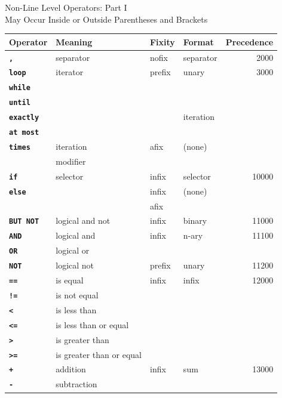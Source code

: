 \documentclass[12pt]{article}
\newcommand{\ttkey}[1]{{\tt \bfseries #1}}
\newlength{\figurewidth}
\newenvironment{boxedfigure}[1][!btp]%
	{\begin{figure*}[#1]
	 \begin{lrbox}{\figurebox}
	 \begin{minipage}{\figurewidth}

	 \vspace*{1ex}}%
	{
	 \vspace*{1ex}

	 \end{minipage}
	 \end{lrbox}

	 \centering
	 \fbox{\hspace*{0.1in}\usebox{\figurebox}\hspace*{0.1in}}
	 \end{figure*}}
\begin{document}
\begin{boxedfigure}[!p]
\begin{center}
Non-Line Level Operators: Part I \\
May Occur Inside or Outside Parentheses and Brackets
\\[1ex]
\begin{tabular}{|l|l|l|l|r|}
\hline
Operator & Meaning & Fixity & Format & Precedence \\
\hline
\ttkey{,} & separator & nofix & separator & 2000
\\\hline
\ttkey{loop} & iterator & prefix & unary & 3000
\\\cline{1-1}
\ttkey{while} &       &        &       &
\\\cline{1-1}
\ttkey{until} &       &        &       &
\\\cline{1-1}\cline{4-4}
\ttkey{exactly} &       &        & iteration       &
\\\cline{1-1}
\ttkey{at most} &       &        &       &
\\\cline{1-4}
\ttkey{times} & iteration & afix   & (none) & \\
               & modifier &        &       &
\\\hline
\ttkey{if} & selector & infix & selector & 10000
\\\cline{1-1}\cline{3-4}
\ttkey{else} & & infix & (none) & \\
             & & afix & &
\\\hline
\ttkey{BUT NOT} & logical and not & infix & binary & 11000
\\\hline
\ttkey{AND} & logical and & infix & n-ary & 11100
\\\cline{1-2}
\ttkey{OR}  & logical or  & & &
\\\hline
\ttkey{NOT}  & logical not & prefix & unary & 11200
\\\hline
\ttkey{==}  & is equal & infix & infix & 12000
\\\cline{1-2}
\ttkey{!=}  & is not equal & & &
\\\cline{1-2}
\ttkey{<}  & is less than & & &
\\\cline{1-2}
\ttkey{<=}  & is less than or equal & & &
\\\cline{1-2}
\ttkey{>}  & is greater than & & &
\\\cline{1-2}
\ttkey{>=}  & is greater than or equal & & &
\\\hline
\ttkey{+}  & addition & infix & sum & 13000
\\\cline{1-2}
\ttkey{-}  & subtraction & & &

\end{tabular}
\end{center}
\end{boxedfigure}
\end{document}
